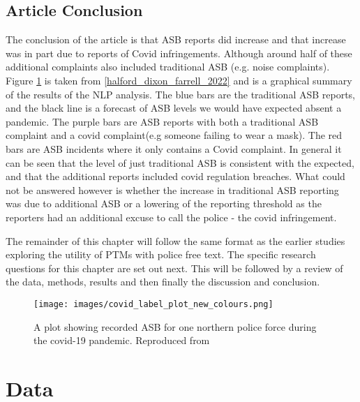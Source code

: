 \subsection{Article Conclusion}
The conclusion of the article is that ASB reports did increase and that increase was in part due to reports of Covid infringements. Although around half of these additional complaints also included traditional ASB (e.g. noise complaints). Figure \ref{fig:ASB}  is taken from \ref{halford_dixon_farrell_2022} and is a graphical summary of the results of the NLP analysis. The blue bars are the traditional ASB reports, and the black line is a forecast of ASB levels we would have expected absent a pandemic. The purple bars are ASB reports with both a traditional ASB complaint and a covid complaint(e.g someone failing to wear a mask). The red bars are ASB incidents where it only contains a Covid complaint. In general it can be seen that the level of just traditional ASB is consistent with the expected, and that the additional reports included covid regulation breaches. What could not be answered however is whether the increase in traditional ASB reporting was due to additional ASB or a lowering of the reporting threshold as the reporters had an additional excuse to call the police - the covid infringement.

The remainder of this chapter will follow the same format as the earlier studies exploring the utility of PTMs with police free text. The specific research questions for this chapter are set out next. This will be followed by a review of the data, methods, results and then finally the discussion and conclusion.


\begin{figure}
  \texttt{[image: images/covid\_label\_plot\_new\_colours.png]}
  \caption[ASB in the Pandemic]{A plot showing recorded ASB for one northern police force during the covid-19 pandemic.  Reproduced from  \textcite{halford_dixon_farrell_2022} }
  \label{fig:ASB}
\end{figure}






\section{Data}

